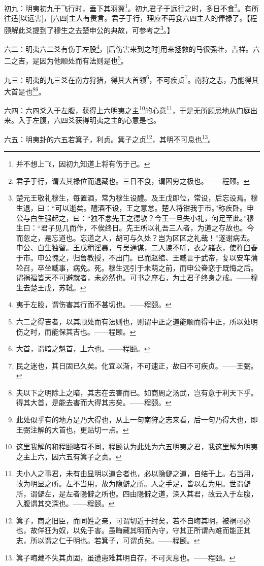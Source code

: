 \documentclass[12pt,oneside]{book}
\begin{document}
初九：明夷初九于飞行时，垂下其羽翼\footnote{并不想上飞，因初九知道上将有伤于己。}。初九君子于远行之时，多日不食\footnote{君子于行，谓去其禄位而退藏也。三日不食，谓困穷之极也。——程颐。}。有所往适[以远害]，[六四]主人有责言。君子于行，理应不再食六四主人的俸禄了。【程颐解此爻提到了穆生之去楚申公的典故，可参考之\footnote{楚元王敬礼穆生，每置酒，常为穆生设醴。及王戊即位，常设，后忘设焉。穆生退，曰：“可以逝矣。醴酒不设，王之意怠。楚人将钳我于市。”称疾卧。申公与白生强起之，曰：“独不念先王之德欤？今王一旦失小礼，何足至此。”穆生曰：“君子见几而作，不俟终日。先王所以礼吾三人者，为道之存故也。今而忽之，是忘道也。忘道之人，胡可与久处？岂为区区之礼哉！”遂谢病去。申公、白生独留。王戊稍淫暴，与吴通谋，二人谏不听，衣之赭衣，使杵臼舂于市。申公愧之，归鲁教授，不出门。已而赵绾、王臧言于武帝，复以安车蒲轮召，卒坐臧事，病免。死。穆生远引于未萌之前，而申公眷恋于既悔之后。谓祸福皆天不可避就者，未必然也。可书之座右，为士君子终身之戒。——穆生去楚王戊，苏轼。}。】

六二：明夷六二爻有伤于左股\footnote{夷于左股，谓伤害其行而不甚切也。——程颐。}，[后伤害来到之时]用来拯救的马很强壮，吉祥。六二之吉，是因为他顺处而有法则是也\footnote{六二之得吉者，以其顺处而有法则也，则谓中正之道能顺而得中正，所以处明伤之时，而能保其吉也。——程颐。}。

九三：明夷的九三爻在南方狩猎，得其大首领\footnote{大首，谓暗之魁首，上六也。——程颐。}，不可疾贞\footnote{民之迷也，其日固已久矣。化宜以渐，不可速正，故曰不可疾贞。——王弼。}。南狩之志，乃能得其大首是也\footnote{夫以下之明除上之暗，其志在去害而已。如商周之汤武，岂有意于利天下乎。得其大首，是能去害而大得其志矣。——程颐。}\footnote{此处似乎有的地方是乃大得也，从上一句南狩之志来看，后一句乃得大也，即王弼注解的大首也，更贴切一点。}。

六四：六四爻入于左腹，获得上六明夷之主\footnote{这里我解的和程颐略有不同，程颐认为此处为六五明夷之君，我这里解为明夷之主上六，因六五有箕子之贞。}的心意\footnote{夫小人之事君，未有由显明以道合者也，必以隐僻之道，自结于上。右当用，故为明显之所。左不当用，故为隐僻之所。人之手足，皆以右为用。世谓僻所，谓僻左，是左者隐僻之所也。四由隐僻之道，深入其君，故云入于左腹，入腹谓其交深也。——程颐。}，于是无所顾忌地从门庭出来。入于左腹，六四爻获得明夷之主的心意是也。

六五：明夷卦的六五若箕子，利贞。箕子之贞\footnote{箕子，商之旧臣，而同姓之亲，可谓切近于纣矣，若不自晦其明，被祸可必也，故佯狂为奴，以免于害。虽晦藏其明而內守，守其正所谓內难而能正其志，所以谓之仁于明也。若箕子，可谓贞矣。——程颐。}，其明不可息也\footnote{箕子晦藏不失其贞固，虽遭患难其明自存，不可灭息也。——程颐。}。
\end{document}
